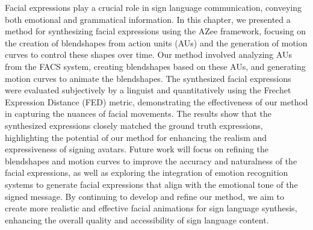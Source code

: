 \documentclass[../../main.tex]{subfiles}
\begin{document}
Facial expressions play a crucial role in sign language communication, conveying both emotional and grammatical information. In this chapter, we presented a method for synthesizing facial expressions using the AZee framework, focusing on the creation of blendshapes from action units (AUs) and the generation of motion curves to control these shapes over time. Our method involved analyzing AUs from the FACS system, creating blendshapes based on these AUs, and generating motion curves to animate the blendshapes. The synthesized facial expressions were evaluated subjectively by a linguist and quantitatively using the Frechet Expression Distance (FED) metric, demonstrating the effectiveness of our method in capturing the nuances of facial movements. The results show that the synthesized expressions closely matched the ground truth expressions, highlighting the potential of our method for enhancing the realism and expressiveness of signing avatars. Future work will focus on refining the blendshapes and motion curves to improve the accuracy and naturalness of the facial expressions, as well as exploring the integration of emotion recognition systems to generate facial expressions that align with the emotional tone of the signed message. By continuing to develop and refine our method, we aim to create more realistic and effective facial animations for sign language synthesis, enhancing the overall quality and accessibility of sign language content.
\end{document}
